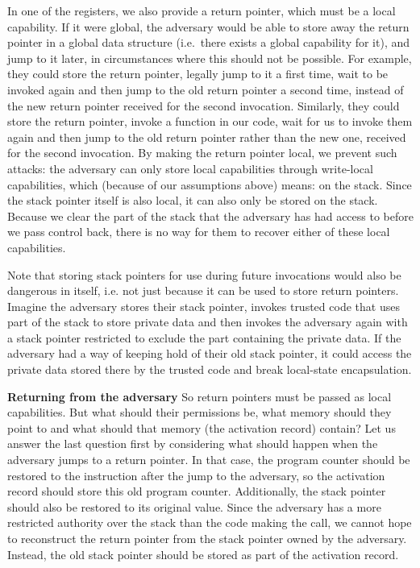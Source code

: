 \documentclass[compsoc,conference,letterpaper,fleqn]{IEEEtran}
\newcommand\lau[1]{{\color{purple} \sf \footnotesize {LS: #1}}\\}
\renewcommand\lau[1]{}
\begin{document}
In one of the registers, we also provide a return pointer, which must be a local
capability. If it were global, the adversary would be able to store away the
return pointer in a global data structure (i.e.\ there exists a global capability for it), and jump to it later, in
circumstances where this should not be possible. For example, they could store
the return pointer, legally jump to it a first time, wait to be invoked again
and then jump to the old return pointer a second time, instead of the new return
pointer received for the second invocation. Similarly, they could store the
return pointer, invoke a function in our code, wait for us to invoke them again
and then jump to the old return pointer rather than the new one, received for the
second invocation.
%
By making the return pointer local, we prevent such attacks: the adversary can
only store local capabilities through write-local capabilities, which (because
of our assumptions above) means: on the stack. Since the stack pointer itself is
also local, it can also only be stored on the stack. Because we clear the part
of the stack that the adversary has had access to before we pass control back,
there is no way for them to recover either of these local capabilities.

Note that storing stack pointers for use during future invocations would also be
dangerous in itself, i.e. not just because it can be used to store return
pointers. Imagine the adversary stores their stack pointer, invokes trusted
code that uses part of the stack to store private data and then invokes the
adversary again with a stack pointer restricted to exclude the part containing
the private data. If the adversary had a way of keeping hold of their old stack
pointer, it could access the private data stored there by the trusted code and
break local-state encapsulation.

\textbf{Returning from the adversary} So return pointers must be passed as local
capabilities. But what should their permissions be, what memory should they
point to and what should that memory (the activation record) contain? Let us
answer the last question first by considering what should happen when the
adversary jumps to a return pointer. In that case, the program counter should be
restored to the instruction after the jump to the adversary, so the activation
record should store this old program counter. Additionally, the stack pointer
should also be restored to its original value. Since the adversary has a more
restricted authority over the stack than the code making the call, we cannot
hope to reconstruct the return pointer from the stack pointer owned by the
adversary. Instead, the old stack pointer should be stored as part of the
activation record.
\end{document}
